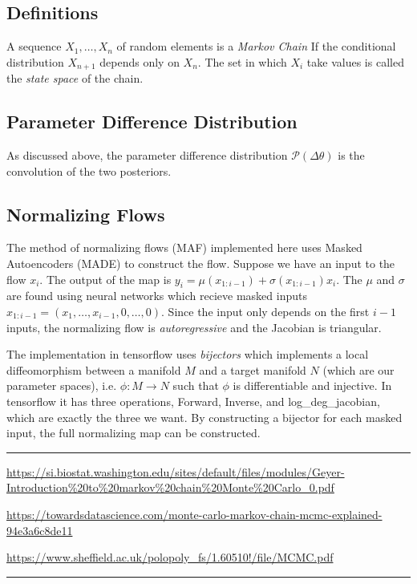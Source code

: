 \subsection{Definitions}

\begin{defn}
A sequence $X_1,\hdots,X_n$ of random elements is a \textit{Markov Chain} If the conditional distribution $X_{n+1}$ depends only on $X_n$. The set in which $X_i$ take values is called the \textit{state space} of the chain.
\end{defn}

\subsection{Parameter Difference Distribution}
As discussed above, the parameter difference distribution $\mathcal{P}(\Delta\theta)$ is the convolution of the two posteriors. 

\subsection{Normalizing Flows}
The method of normalizing flows (MAF) implemented here uses Masked Autoencoders (MADE) to construct the flow. Suppose we have an input to the flow $x_i$. The output of the map is $y_i= \mu(x_{1:i-1})+\sigma(x_{1:i-1})x_i$. The $\mu$ and $\sigma$ are found using neural networks which recieve masked inputs $x_{1:i-1}=(x_1,\ldots,x_{i-1},0,\ldots,0)$. Since the input only depends on the first $i-1$ inputs, the normalizing flow is \textit{autoregressive} and the Jacobian is triangular.

The implementation in tensorflow uses \textit{bijectors} which implements a local diffeomorphism between a manifold $M$ and a target manifold $N$ (which are our parameter spaces), i.e. $\phi:M\rightarrow N$ such that $\phi$ is differentiable and injective. In tensorflow it has three operations, Forward, Inverse, and log\_deg\_jacobian, which are exactly the three we want. By constructing a bijector for each masked input, the full normalizing map can be constructed.

\hrule
\url{https://si.biostat.washington.edu/sites/default/files/modules/Geyer-Introduction\%20to\%20markov\%20chain\%20Monte\%20Carlo_0.pdf}

\url{https://towardsdatascience.com/monte-carlo-markov-chain-mcmc-explained-94e3a6c8de11}

\url{https://www.sheffield.ac.uk/polopoly_fs/1.60510!/file/MCMC.pdf}
\hrule
